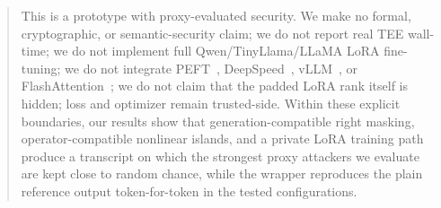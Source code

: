 \begin{abstract}
This is a prototype with proxy-evaluated security. We make no formal, cryptographic, or semantic-security claim; we do not report real TEE wall-time; we do not implement full Qwen/TinyLlama/LLaMA LoRA fine-tuning; we do not integrate PEFT~\cite{peft2022}, DeepSpeed~\cite{rasley2020deepspeed}, vLLM~\cite{kwon2023vllm}, or FlashAttention~\cite{dao2022flashattention}; we do not claim that the padded LoRA rank itself is hidden; loss and optimizer remain trusted-side. Within these explicit boundaries, our results show that generation-compatible right masking, operator-compatible nonlinear islands, and a private LoRA training path produce a transcript on which the strongest proxy attackers we evaluate are kept close to random chance, while the wrapper reproduces the plain reference output token-for-token in the tested configurations.
\end{abstract}
